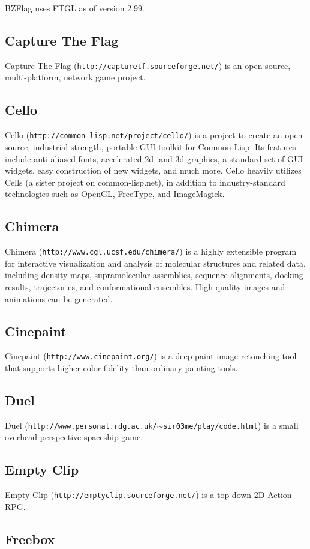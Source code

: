 BZFlag uses FTGL as of version 2.99.\subsection{Capture The Flag}\label{ftgl-projects_capturetf}
Capture The Flag ({\tt http://capturetf.sourceforge.net/}) is an open source, multi-\/platform, network game project.\subsection{Cello}\label{ftgl-projects_cello}
Cello ({\tt http://common-\/lisp.net/project/cello/}) is a project to create an open-\/source, industrial-\/strength, portable GUI toolkit for Common Lisp. Its features include anti-\/aliased fonts, accelerated 2d-\/ and 3d-\/graphics, a standard set of GUI widgets, easy construction of new widgets, and much more. Cello heavily utilizes Cells (a sister project on common-\/lisp.net), in addition to industry-\/standard technologies such as OpenGL, FreeType, and ImageMagick.\subsection{Chimera}\label{ftgl-projects_chimera}
Chimera ({\tt http://www.cgl.ucsf.edu/chimera/}) is a highly extensible program for interactive visualization and analysis of molecular structures and related data, including density maps, supramolecular assemblies, sequence alignments, docking results, trajectories, and conformational ensembles. High-\/quality images and animations can be generated.\subsection{Cinepaint}\label{ftgl-projects_cinepaint}
Cinepaint ({\tt http://www.cinepaint.org/}) is a deep paint image retouching tool that supports higher color fidelity than ordinary painting tools.\subsection{Duel}\label{ftgl-projects_duel}
Duel ({\tt http://www.personal.rdg.ac.uk/$\sim$sir03me/play/code.html}) is a small overhead perspective spaceship game.\subsection{Empty Clip}\label{ftgl-projects_emptyclip}
Empty Clip ({\tt http://emptyclip.sourceforge.net/}) is a top-\/down 2D Action RPG.\subsection{Freebox}\label{ftgl-projects_freebox}
